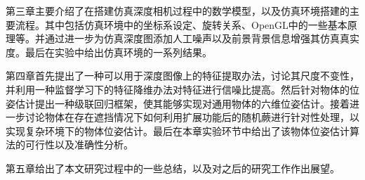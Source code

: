 第三章主要介绍了在搭建仿真深度相机过程中的数学模型，以及仿真环境搭建的主要流程。其中包括仿真环境中的坐标系设定、旋转关系、OpenGL中的一些基本原理等。并通过进一步为仿真深度图添加人工噪声以及前景背景信息增强其仿真真实度。最后在实验中给出仿真环境的一系列结果。

第四章首先提出了一种可以用于深度图像上的特征提取办法，讨论其尺度不变性，并利用一种监督学习下的特征降维办法对特征进行信噪比提高。然后针对物体的位姿估计提出一种级联回归框架，使其能够实现对通用物体的六维位姿估计。接着进一步讨论物体在存在遮挡情况下如何利用扩展功能后的随机蕨进行针对性处理，以实现复杂环境下的物体位姿估计。最后在本章实验环节中给出了该物体位姿估计算法的可行性以及准确性分析。

第五章给出了本文研究过程中的一些总结，以及对之后的研究工作作出展望。














